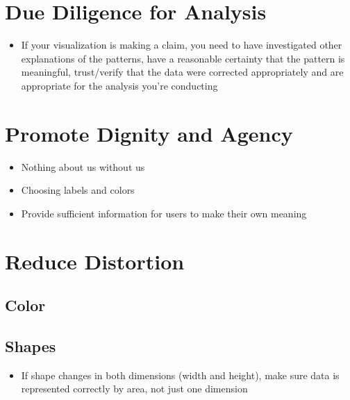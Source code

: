 \documentclass[
]{krantz}
\providecommand{\tightlist}{%
  \setlength{\itemsep}{0pt}\setlength{\parskip}{0pt}}
\begin{document}
\hypertarget{due-diligence-for-analysis}{%
\section{Due Diligence for Analysis}\label{due-diligence-for-analysis}}

\begin{itemize}
\tightlist
\item
  If your visualization is making a claim, you need to have investigated other
  explanations of the patterns, have a reasonable certainty that the pattern is
  meaningful, trust/verify that the data were corrected appropriately and are
  appropriate for the analysis you're conducting
\end{itemize}

\hypertarget{promote-dignity-and-agency}{%
\section{Promote Dignity and Agency}\label{promote-dignity-and-agency}}

\begin{itemize}
\tightlist
\item
  Nothing about us without us
\item
  Choosing labels and colors
\item
  Provide sufficient information for users to make their own meaning
\end{itemize}

\hypertarget{reduce-distortion}{%
\section{Reduce Distortion}\label{reduce-distortion}}

\hypertarget{color}{%
\subsection{Color}\label{color}}

\hypertarget{shapes}{%
\subsection{Shapes}\label{shapes}}

\begin{itemize}
\tightlist
\item
  If shape changes in both dimensions (width and height), make sure data is
  represented correctly by area, not just one dimension
\end{itemize}
\end{document}
